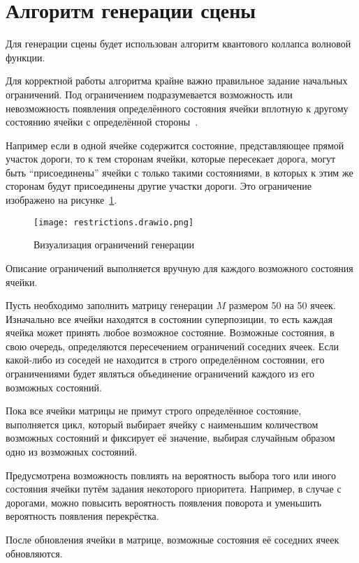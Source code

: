 \section{Алгоритм генерации сцены}

Для генерации сцены будет использован алгоритм квантового коллапса волновой функции. 

Для корректной работы алгоритма крайне важно правильное задание начальных ограничений. Под ограничением подразумевается возможность или невозможность появления определённого состояния ячейки вплотную к другому состоянию ячейки с определённой стороны~\cite{QWFC}.

Например если в одной ячейке содержится состояние, представляющее прямой участок дороги, то к тем сторонам ячейки, которые пересекает дорога, могут быть ``присоединены'' ячейки с только такими состояниями, в которых к этим же сторонам будут присоединены другие участки дороги. Это ограничение изображено на рисунке~\ref{fig:restrictions}.

\begin{figure}[h!]
    \centering
    \texttt{[image: restrictions.drawio.png]}
    \caption{Визуализация ограничений генерации}
    \label{fig:restrictions}
\end{figure}

Описание ограничений выполняется вручную для каждого возможного состояния ячейки.

Пусть необходимо заполнить матрицу генерации $M$ размером 50 на 50 ячеек. Изначально все ячейки находятся в состоянии суперпозиции, то есть каждая ячейка может принять любое возможное состояние. Возможные состояния, в свою очередь, определяются пересечением ограничений соседних ячеек. Если какой-либо из соседей не находится в строго определённом состоянии, его ограничениями будет являться объединение ограничений каждого из его возможных состояний.

Пока все ячейки матрицы не примут строго определённое состояние, выполняется цикл, который выбирает ячейку с наименьшим количеством возможных состояний и фиксирует её значение, выбирая случайным образом одно из возможных состояний.

Предусмотрена возможность повлиять на вероятность выбора того или иного состояния ячейки путём задания некоторого приоритета. Например, в случае с дорогами, можно повысить вероятность появления поворота и уменьшить вероятность появления перекрёстка.

После обновления ячейки в матрице, возможные состояния её соседних ячеек обновляются.

